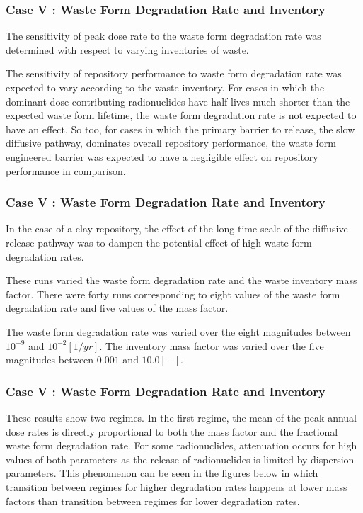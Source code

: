 
\begin{frame}[c]
  \frametitle{Case V : Waste Form Degradation Rate and Inventory}
The sensitivity of peak dose rate to the waste form degradation rate was 
determined with respect to varying inventories of waste.

The sensitivity of repository performance to waste form degradation rate was
expected to vary according to the waste inventory. For cases in which the dominant dose contributing 
radionuclides have half-lives much shorter than the expected waste form lifetime, 
the waste form degradation rate is not expected to have an effect. So too, for 
cases in which the primary barrier to release, the slow diffusive pathway, 
dominates overall repository performance, the waste form engineered barrier was
expected to have a negligible effect on repository performance in comparison.
\end{frame}

\begin{frame}[c]
  \frametitle{Case V : Waste Form Degradation Rate and Inventory}
In the case of a clay repository, the effect of the long time scale of the 
diffusive release pathway was to dampen the potential effect of high waste form 
degradation rates. 

These runs varied the waste form degradation rate and the waste inventory mass 
factor.  There were forty runs corresponding to eight values of the waste form degradation 
rate and five values of the mass factor.

The waste form degradation rate was varied over the eight magnitudes 
between $10^{-9}$ and $10^{-2} [1/yr]$. The inventory mass factor was varied 
over the five magnitudes between $0.001$ and $10.0 [-]$. 
\end{frame}

\begin{frame}[c]
  \frametitle{Case V : Waste Form Degradation Rate and Inventory}
These results show two regimes. In the first regime, the mean of the peak annual 
dose rates is directly proportional to both the mass factor and the fractional 
waste form degradation rate. For some radionuclides, attenuation occurs for high 
values of both parameters as the release of radionuclides is limited by 
dispersion parameters. This phenomenon can be seen in the figures below in which 
transition between regimes for higher degradation rates happens at lower mass 
factors than transition between regimes for lower degradation rates. 
\end{frame}

